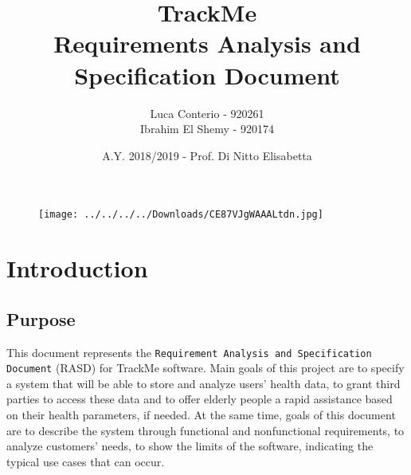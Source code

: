 \documentclass[12pt,a4paper]{article}
\author{Luca Conterio - 920261\\  
		  Ibrahim El Shemy - 920174}
\date{A.Y. 2018/2019 - Prof. Di Nitto Elisabetta}
\title{%
	\textbf{TrackMe} \\
	\large Requirements Analysis and Specification Document
}
\begin{document}
	
	\begin{figure}
		\centering
		\texttt{[image: ../../../../Downloads/CE87VJgWAAALtdn.jpg]}
	\end{figure}
	
	\maketitle

	\newpage
	\tableofcontents
	\newpage
	
	\section{Introduction}
		\subsection{Purpose}
		 This document represents the \texttt{Requirement Analysis and Specification Document} (RASD) for TrackMe software. Main goals of this project are to specify a system that will be able to store and analyze users' health data, to grant third parties to access these data and to offer elderly people a rapid assistance based on their health parameters, if needed.
		 At the same time, goals of this document are to describe the system through functional and nonfunctional requirements, to analyze customers' needs, to show the limits of the software, indicating the typical use cases that can occur.
\end{document}
